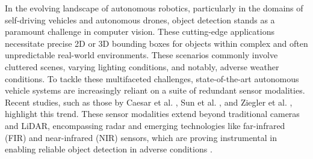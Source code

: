 \documentclass[report.tex]{subfiles}
\begin{document}
            


        
        
        

    In the evolving landscape of autonomous robotics, particularly in the domains of self-driving vehicles and autonomous drones, object detection stands as a paramount challenge in computer vision. These cutting-edge applications necessitate precise 2D or 3D bounding boxes for objects within complex and often unpredictable real-world environments. These scenarios commonly involve cluttered scenes, varying lighting conditions, and notably, adverse weather conditions. To tackle these multifaceted challenges, state-of-the-art autonomous vehicle systems are increasingly reliant on a suite of redundant sensor modalities. Recent studies, such as those by Caesar et al. \cite{caesar2020nuscenes}, Sun et al. \cite{Sun_2020_CVPR}, and Ziegler et al. \cite{ziegler2014making}, highlight this trend. These sensor modalities extend beyond traditional cameras and LiDAR, encompassing radar and emerging technologies like far-infrared (FIR) and near-infrared (NIR) sensors, which are proving instrumental in enabling reliable object detection in adverse conditions \cite{bijelic2020seeing}.
\end{document}
